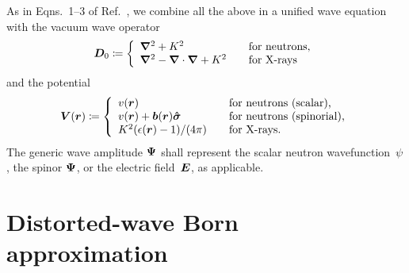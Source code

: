 As in Eqns.~1--3 of Ref.~\cite{PoVB20},
we combine all the above in a unified wave equation
%
with the vacuum wave operator
%
%
\begin{equation}\label{EDo}
  \bm{D}_0 \coloneqq \left\{ \begin{array}{ll}
      \bm{\nabla}^2 + K^2                     &\text{~~~for neutrons,}\\
      \bm{\nabla}^2 - \bm{\nabla}\cdot\bm{\nabla} + K^2 &\text{~~~for X-rays}
  \end{array}\right.
\end{equation}
%
and the potential
%
%
\begin{equation}\label{ETV}
  \bm{V}(\bm{r}) \coloneqq \left\{ \begin{array}{ll}
      v(\bm{r})                         &\text{~~~for neutrons (scalar),}\\
      v(\bm{r})+\bm{b}(\bm{r})\bm{\hat\sigma}       &\text{~~~for neutrons (spinorial),}\\
      K^2(\epsilon(\bm{r})-1)/(4\pi) &\text{~~~for X-rays.}
  \end{array}\right.
\end{equation}
The generic wave amplitude $\bm{\Psi}$
%
shall represent
the scalar neutron wavefunction~$\psi$,
the spinor $\bm{\Psi}$, or the electric field~$\bm{E}$, as applicable.

\section{Distorted-wave Born approximation}\label{SDWBA}

